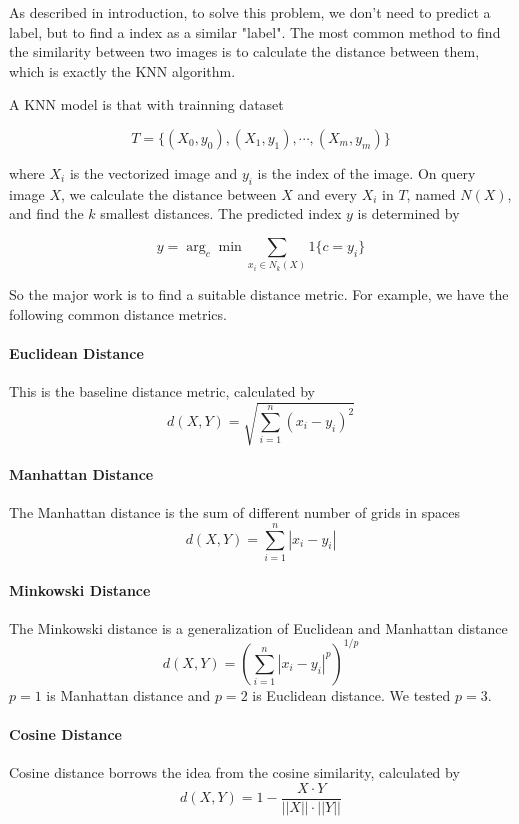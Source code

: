 \documentclass{article}
\begin{document}
As described in introduction, to solve this problem, we don't need to predict a label, but to find a index as a similar "label". The most common method to find the similarity between two images is to calculate the distance between them, which is exactly the KNN algorithm. 

A KNN model is that with trainning dataset

\[
    T = \{(X_0, y_0), (X_1, y_1), \cdots, (X_m, y_m)\}
\]

where $X_i$ is the vectorized image and $y_i$ is the index of the image. On query image $X$, we calculate the distance between $X$ and every $X_i$ in $T$, named $N(X)$, and find the $k$ smallest distances. The predicted index $y$ is determined by

\[
    y = \arg_c \min \sum_{x_i \in N_k(X)} 1\{c = y_i\}
\]

So the major work is to find a suitable distance metric. For example, we have the following common distance metrics.

\paragraph{Euclidean Distance} This is the baseline distance metric, calculated by
\[
    d(X, Y) = \sqrt{\sum_{i=1}^{n} (x_i - y_i)^2}
\]

\paragraph{Manhattan Distance} The Manhattan distance is the sum of different number of grids in spaces
\[
    d(X, Y) = \sum_{i=1}^{n} |x_i - y_i|
\]

\paragraph{Minkowski Distance} The Minkowski distance is a generalization of Euclidean and Manhattan distance
\[
    d(X, Y) = \left(\sum_{i=1}^{n} |x_i - y_i|^p\right)^{1/p}
\]
$p = 1$ is Manhattan distance and $p = 2$ is Euclidean distance. We tested $p = 3$.

\paragraph{Cosine Distance} Cosine distance borrows the idea from the cosine similarity, calculated by
\[
    d(X, Y) = 1 - \frac{X \cdot Y}{||X|| \cdot ||Y||}
\]
\end{document}
